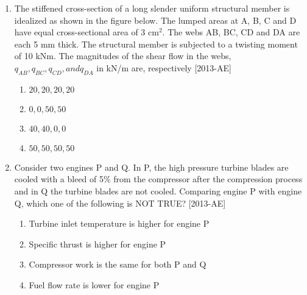 \documentclass[journal,12pt,onecolumn]{IEEEtran}
\theoremstyle{remark}
\begin{document}
\begin{enumerate}
\begin{figure}[!ht]
    \label{fig:my_label}
    \end{figure}

    \item The stiffened cross-section of a long slender uniform structural member is idealized as shown in the figure below. The lumped areas at A, B, C and D have equal cross-sectional area of 3 cm$^2$. The webs AB, BC, CD and DA are each 5 mm thick. The structural member is subjected to a twisting moment of 10 kNm. The magnitudes of the shear flow in the webs, $q_{AB}, q_{BC}, q_{CD}, and q_{DA}$ in kN/m are, respectively \hfill{[2013-AE]}
    \begin{figure}[!ht]
\centering
{}%

\label{fig:my_label}
\end{figure}

    \begin{enumerate}
        \item $20, 20, 20, 20$
        \item $0, 0, 50, 50$
        \item $40, 40, 0, 0$
        \item $50, 50, 50, 50$
    \end{enumerate}

    \item Consider two engines P and Q. In P, the high pressure turbine blades are cooled with a bleed of 5\% from the compressor after the compression process and in Q the turbine blades are not cooled. Comparing engine P with engine Q, which one of the following is NOT TRUE?  \hfill{[2013-AE]}
    \begin{enumerate}
        \item Turbine inlet temperature is higher for engine P 
        \item Specific thrust is higher for engine P 
        \item Compressor work is the same for both P and Q
        \item Fuel flow rate is lower for engine P 
    \end{enumerate}


\end{enumerate}
\end{document}
